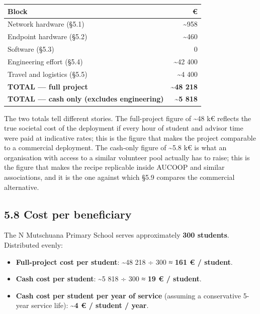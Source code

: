 \begin{longtable}[]{@{}lr@{}}
\toprule\noalign{}
Block & € \\
\midrule\noalign{}
\endhead
\bottomrule\noalign{}
\endlastfoot
Network hardware (§5.1) & \textasciitilde958 \\
Endpoint hardware (§5.2) & \textasciitilde460 \\
Software (§5.3) & 0 \\
Engineering effort (§5.4) & \textasciitilde42 400 \\
Travel and logistics (§5.5) & \textasciitilde4 400 \\
\textbf{TOTAL --- full project} & \textbf{\textasciitilde48 218} \\
\textbf{TOTAL --- cash only (excludes engineering)} &
\textbf{\textasciitilde5 818} \\
\end{longtable}

The two totals tell different stories. The full-project figure of
\textasciitilde48 k€ reflects the true societal cost of the deployment
if every hour of student and advisor time were paid at indicative rates;
this is the figure that makes the project comparable to a commercial
deployment. The cash-only figure of \textasciitilde5.8 k€ is what an
organisation with access to a similar volunteer pool actually has to
raise; this is the figure that makes the recipe replicable inside AUCOOP
and similar associations, and it is the one against which §5.9 compares
the commercial alternative.

\hypertarget{cost-per-beneficiary}{%
\subsection{5.8 Cost per beneficiary}\label{cost-per-beneficiary}}

The N Mutschuana Primary School serves approximately \textbf{300
students}. Distributed evenly:

\begin{itemize}
\tightlist
\item
  \textbf{Full-project cost per student}: \textasciitilde48 218 ÷ 300 ≈
  \textbf{161 € / student}.
\item
  \textbf{Cash cost per student}: \textasciitilde5 818 ÷ 300 ≈
  \textbf{19 € / student}.
\item
  \textbf{Cash cost per student per year of service} (assuming a
  conservative 5-year service life): \textasciitilde{}\textbf{4 € /
  student / year}.
\end{itemize}


